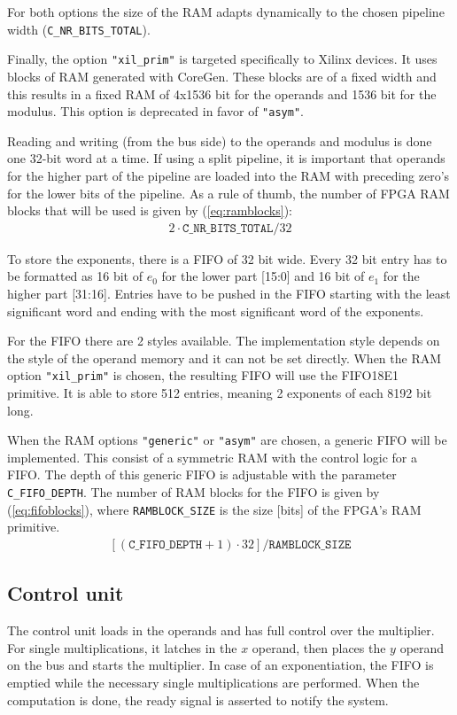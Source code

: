 For both options the size of the RAM adapts dynamically to the chosen pipeline width (\verb|C_NR_BITS_TOTAL|).

Finally, the option \verb|"xil_prim"| is targeted specifically to Xilinx devices. It uses blocks of RAM generated with CoreGen. These blocks are of a fixed width and this results in a fixed RAM of 4x1536 bit for the operands and 1536 bit for the modulus. This option is deprecated in favor of \verb|"asym"|.

Reading and writing (from the bus side) to the operands and modulus is done one 32-bit word at a time. If using a split pipeline, it is important that operands for the higher part of the pipeline are loaded into the RAM with preceding zero's for the lower bits of the pipeline. As a rule of thumb, the number of FPGA RAM blocks that will be used is given by (\ref{eq:ramblocks}):
\begin{align}
	2 \cdot \mathtt{C\_NR\_BITS\_TOTAL} / 32\label{eq:ramblocks}
\end{align}
\newline

To store the exponents, there is a FIFO of 32 bit wide. Every 32 bit entry has to be formatted as 16 bit of $e_0$ for the
lower part [15:0] and 16 bit of $e_1$ for the higher part [31:16]. Entries have to be pushed in the FIFO starting with the least significant word and ending with the most significant word of the exponents.

For the FIFO there are 2 styles available. The implementation style depends on the style of the operand memory and it can not be set directly. When  the RAM option \verb|"xil_prim"| is chosen, the resulting FIFO will use the FIFO18E1 primitive. It is able to store 512 entries, meaning 2 exponents of each 8192 bit long.

When the RAM options \verb|"generic"| or \verb|"asym"| are chosen, a generic FIFO will be implemented. This consist of a symmetric RAM with the control logic for a FIFO. The depth of this generic FIFO is adjustable with the parameter \verb|C_FIFO_DEPTH|.
The number of RAM blocks for the FIFO is given by (\ref{eq:fifoblocks}), where \verb|RAMBLOCK_SIZE| is the size [bits] of the FPGA's RAM primitive.
\begin{align}
	\left[\left(\mathtt{C\_FIFO\_DEPTH}+1\right) \cdot 32 \right]/ \mathtt{RAMBLOCK\_SIZE} \label{eq:fifoblocks}
\end{align}

\subsection{Control unit}
The control unit loads in the operands and has full control over the multiplier. For single multiplications, it latches in 
the $x$ operand, then places the $y$ operand on the bus and starts the multiplier. In case of an exponentiation, the FIFO is 
emptied while the necessary single multiplications are performed. When the computation is done, the ready signal is 
asserted to notify the system.

